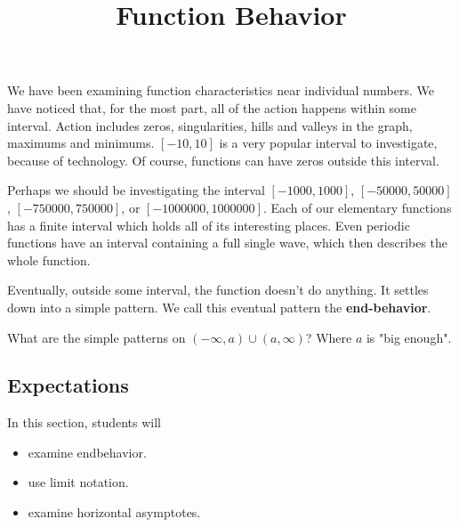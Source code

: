 \documentclass{ximera}
\title{Function Behavior}
\begin{document}
\begin{abstract}
\end{abstract}
\maketitle




We have been examining function characteristics near individual numbers. We have noticed that, for the most part, all of the action happens within some interval.  Action includes zeros, singularities, hills and valleys in the graph, maximums and minimums.  $[-10, 10]$  is a very popular interval to investigate, because of technology.  Of course, functions can have zeros outside this interval.  

Perhaps we should be investigating the interval $[-1000, 1000]$, $[-50000, 50000]$, $[-750000, 750000]$, or $[-1000000, 1000000]$. Each of our elementary functions has a finite interval which holds all of its interesting places.  Even periodic functions have an interval containing a full single wave, which then describes the whole function.

Eventually, outside some interval, the function doesn't do anything.  It settles down into a simple pattern.  We call this eventual pattern the \textbf{end-behavior}.



What are the simple patterns on $(-\infty, a) \cup (a, \infty)$?  Where $a$ is "big enough".








\subsection{Expectations}


\begin{sectionOutcomes}
In this section, students will 

\begin{itemize}
\item examine endbehavior.
\item use limit notation.
\item examine horizontal asymptotes.
\end{itemize}
\end{sectionOutcomes}
\end{document}
